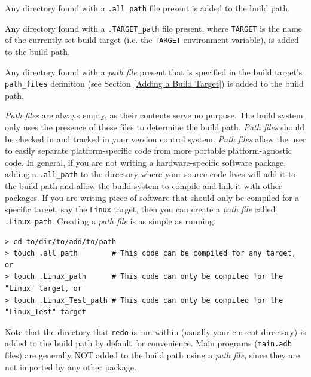 \vspace{5mm} %
\begin{spacedenumerate}
  \item Any directory found with a \texttt{.all\_path} file present is added to the build path.
  \item Any directory found with a \texttt{.TARGET\_path} file present, where \texttt{TARGET} is the name of the currently set build target (i.e. the \texttt{TARGET} environment variable), is added to the build path.
  \item Any directory found with a \textit{path file} present that is specified in the build target's \texttt{path\_files} definition (see Section \ref{Adding a Build Target}) is added to the build path.
\end{spacedenumerate}
\vspace{5mm} %

\textit{Path files} are always empty, as their contents serve no purpose. The build system only uses the presence of these files to determine the build path. \textit{Path files} should be checked in and tracked in your version control system. \textit{Path files} allow the user to easily separate platform-specific code from more portable platform-agnostic code. In general, if you are not writing a hardware-specific software package, adding a \texttt{.all\_path} to the directory where your source code lives will add it to the build path and allow the build system to compile and link it with other packages. If you are writing piece of software that should only be compiled for a specific target, say the \texttt{Linux} target, then you can create a \textit{path file} called \texttt{.Linux\_path}. Creating a \textit{path file} is as simple as running.

\vspace{5mm} %
\begin{verbatim}
> cd to/dir/to/add/to/path
> touch .all_path        # This code can be compiled for any target, or
> touch .Linux_path      # This code can only be compiled for the "Linux" target, or
> touch .Linux_Test_path # This code can only be compiled for the "Linux_Test" target
\end{verbatim}
\vspace{5mm} %

Note that the directory that \texttt{redo} is run within (usually your current directory) is added to the build path by default for convenience. Main programs (\texttt{main.adb} files) are generally NOT added to the build path using a \textit{path file}, since they are not imported by any other package. \\

